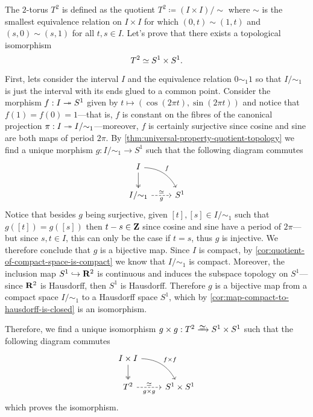\begin{example}[Torus \(T^2\)]
    \label{exp:T2-isomorphic-S1*S1}
    The \(2\)-torus \(T^2\) is defined as the quotient
    \(T^2 \coloneq (I \times I)/{\sim}\) where \(\sim\) is the smallest equivalence
    relation on \(I \times I\) for which \((0, t) \sim (1, t)\) and
    \((s, 0) \sim (s, 1)\) for all \(t, s \in I\). Let's prove that there exists a
    topological isomorphism
    \[
        T^2 \simeq S^1 \times S^1.
    \]

    First, lets consider the interval \(I\) and the equivalence relation
    \(0 \sim_1 1\) so that \(I/{\sim_1}\) is just the interval with its ends glued
    to a common point. Consider the morphism \(f: I \twoheadrightarrow S^1\) given by
    \(t \mapsto (\cos(2 \pi t), \sin(2 \pi t))\) and notice that
    \(f(1) = f(0) = 1\)---that is, \(f\) is constant on the fibres of the canonical
    projection \(\pi: I \twoheadrightarrow I/{\sim_1}\)---moreover, \(f\) is certainly surjective
    since cosine and sine are both maps of period \(2 \pi\). By
    \cref{thm:universal-property-quotient-topology} we find a unique morphism
    \(g: I/{\sim_1} \to S^1\) such that the following diagram commutes
    \[
        \begin{tikzcd}
            I \ar[d, two heads] \ar[rd, bend left, "f"] & \\
            I/{\sim_1} \ar[r, dashed, "\dis", "g"']     &S^1
        \end{tikzcd}
    \]
    Notice that besides \(g\) being surjective, given \([t], [s] \in I/{\sim_1}\)
    such that \(g([t]) = g([s])\) then \(t - s \in \mathbf{Z}\) since cosine and sine have a
    period of \(2 \pi\)---but since \(s, t \in I\), this can only be the case if
    \(t = s\), thus \(g\) is injective. We therefore conclude that \(g\) is a
    bijective map. Since \(I\) is compact, by
    \cref{cor:quotient-of-compact-space-is-compact} we know that \(I/{\sim_1}\) is
    compact. Moreover, the inclusion map \(S^1 \hookrightarrow \mathbf{R}^2\) is continuous and induces
    the subspace topology on \(S^1\)---since \(\mathbf{R}^2\) is Hausdorff, then \(S^1\)
    is Hausdorff. Therefore \(g\) is a bijective map from a compact space
    \(I/{\sim_1}\) to a Hausdorff space \(S^1\), which by
    \cref{cor:map-compact-to-hausdorff-is-closed} is an isomorphism.

    Therefore, we find a unique isomorphism
    \(g \times g: T^2 \isoto S^1 \times S^1\) such that the following diagram
    commutes
    \[
        \begin{tikzcd}
            I \times I \ar[d, two heads] \ar[rd, bend left, "f \times f"] & \\
            T^2 \ar[r, dashed, "\dis", "g \times g"']                     &S^1 \times S^1
        \end{tikzcd}
    \]
    which proves the isomorphism.


\end{example}
